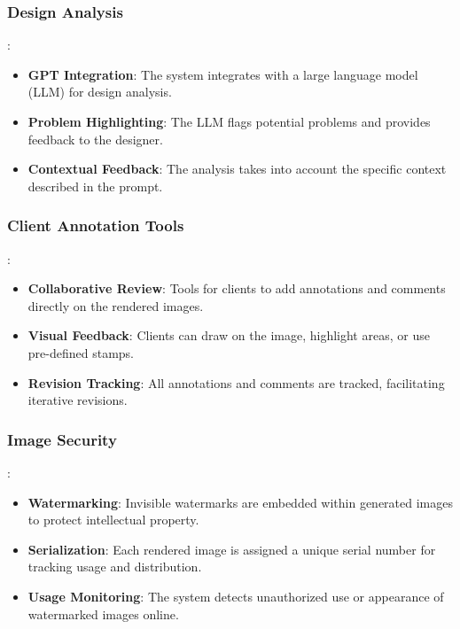 \documentclass{article}
\begin{document}
\begin{itemize}
\subsubsection{Design Analysis}:
\begin{itemize}
    \item \textbf{GPT Integration}: The system integrates with a large language model (LLM) for design analysis.
    \item \textbf{Problem Highlighting}: The LLM flags potential problems and provides feedback to the designer.
    \item \textbf{Contextual Feedback}: The analysis takes into account the specific context described in the prompt.
\end{itemize}

\subsubsection{Client Annotation Tools}:
\begin{itemize}
    \item \textbf{Collaborative Review}: Tools for clients to add annotations and comments directly on the rendered images.
    \item \textbf{Visual Feedback}: Clients can draw on the image, highlight areas, or use pre-defined stamps.
    \item \textbf{Revision Tracking}: All annotations and comments are tracked, facilitating iterative revisions.
\end{itemize}

\subsubsection{Image Security}:
\begin{itemize}
    \item \textbf{Watermarking}: Invisible watermarks are embedded within generated images to protect intellectual property.
    \item \textbf{Serialization}: Each rendered image is assigned a unique serial number for tracking usage and distribution.
    \item \textbf{Usage Monitoring}: The system detects unauthorized use or appearance of watermarked images online.
\end{itemize}


\end{itemize}
\end{document}

